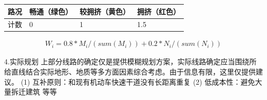 \documentclass[12pt,a4paper]{mcmthesis}
\begin{document}
    \begin{table}
        \centering
        \begin{tabular}{|l|l|l|l|}
            \hline
            路况 & 畅通（绿色） & 较拥挤（黄色） & 拥挤（红色） \\ \hline
            计数 & 0      & 1       & 1.5    \\ \hline
        \end{tabular}
    \end{table}
    \begin{equation}
        \begin{aligned}
            W_i=0.8*M_i/(sum(M_i))+0.2*N_i/(sum(N_i))
        \end{aligned}
    \end{equation}

    4.实际规划
    上部分线路的确定仅是提供模糊规划方案，实际线路确定应当围绕所给直线结合实际地形、地质等多方面因素综合考虑。由于信息有限，这里仅提供建议。
    (1)    互补原则：和现有机动车快速干道没有长距离重复
    (2)    低成本性：避免大量拆迁建筑
    等等
\end{document}
